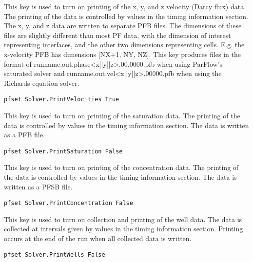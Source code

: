 {
This key is used to turn on printing of the x, y, and z 
velocity (Darcy flux) data. The printing of the data is 
controlled by values in the timing information section. 
The x, y, and z data are written to separate PFB files. 
The dimensions of these files are slightly different 
than most PF data,  with the dimension of interest 
representing interfaces, and the other two dimensions 
representing cells. E.g. the x-velocity PFB has dimensions
[NX+1, NY, NZ]. This key produces files in the format of 
runname.out.phase<x||y||z>.00.0000.pfb when using ParFlow's
saturated solver and runname.out.vel<x||y||z>.00000.pfb
when using the Richards equation solver.
}
\begin{display}\begin{verbatim}
pfset Solver.PrintVelocities True
\end{verbatim}\end{display}

{
This key is used to turn on printing of the saturation data.
The printing of the data is controlled by values in the
timing information section.  The data is written as a PFB file.
}
\begin{display}\begin{verbatim}
pfset Solver.PrintSaturation False
\end{verbatim}\end{display}

{
This key is used to turn on printing of the concentration data.
The printing of the data is controlled by values in the
timing information section.  The data is written as a PFSB file.
}
\begin{display}\begin{verbatim}
pfset Solver.PrintConcentration False
\end{verbatim}\end{display}

{
This key is used to turn on collection and printing of the
well data.  The data is collected at intervals given by values
in the timing information section.  Printing occurs at the
end of the run when all collected data is written.
}
\begin{display}\begin{verbatim}
pfset Solver.PrintWells False
\end{verbatim}\end{display}

